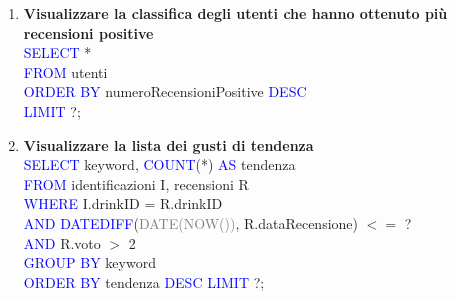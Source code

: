 \documentclass[a4paper,12pt]{report}
\begin{document}
\begin{enumerate}
    \item \textbf{Visualizzare la classifica degli utenti che hanno ottenuto più recensioni positive}\\
        \textcolor{blue}{SELECT} *\\
        \textcolor{blue}{FROM} utenti\\
        \textcolor{blue}{ORDER BY} numeroRecensioniPositive \textcolor{blue}{DESC}\\
        \textcolor{blue}{LIMIT} ?;
        
    \item \textbf{ Visualizzare la lista dei gusti di tendenza}\\
        \textcolor{blue}{SELECT} keyword, \textcolor{blue}{COUNT}(*) \textcolor{blue}{AS} tendenza\\
        \textcolor{blue}{FROM} identificazioni I, recensioni R\\
        \textcolor{blue}{WHERE} I.drinkID = R.drinkID\\
        \textcolor{blue}{AND} \textcolor{blue}{DATEDIFF}(\textcolor{gray}{DATE(NOW())}, R.dataRecensione) $<=$ ?\\
        \textcolor{blue}{AND} R.voto $>$ 2\\
        \textcolor{blue}{GROUP BY} keyword\\
        \textcolor{blue}{ORDER BY} tendenza \textcolor{blue}{DESC}
        \textcolor{blue}{LIMIT} ?;
        \\\\
    

\end{enumerate}
\end{document}

